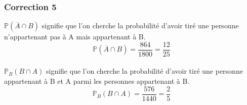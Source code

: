 \documentclass[15pt, mathserif]{beamer}
\begin{document}
\begin{frame}
\vspace{-10mm}
	\frametitle{Correction 5}

 $\mathbb{P}(\overline{A} \cap B)$ signifie que l'on cherche la probabilité d'avoir tiré une personne  n'appartenant pas à A mais appartenant à B. $$\mathbb{P}(\overline{A} \cap B)=\dfrac{864}{1800 }= \dfrac{12}{25}$$
 \\ $\mathbb{P}_{B} (B \cap A)$ signifie que l'on cherche la probabilité d'avoir tiré une personne appartenant à B et A parmi les personnes appartenant à B. $$\mathbb{P}_{B} (B \cap A) =\dfrac{576}{1440 }= \dfrac{2}{5}$$
\end{frame}
\end{document}
